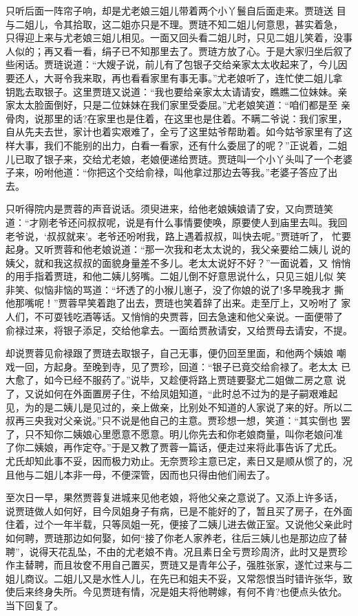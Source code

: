只听后面一阵帘子响，却是尤老娘三姐儿带着两个小丫鬟自后面走来。贾琏送
目与二姐儿，令其拾取，这二姐亦只是不理。贾琏不知二姐儿何意思，甚实着急，
只得迎上来与尤老娘三姐儿相见。一面又回头看二姐儿时，只见二姐儿笑着，没事
人似的；再又看一看，绢子已不知那里去了。贾琏方放了心。于是大家归坐后叙了
些闲话。贾琏说道：“大嫂子说，前儿有了包银子交给亲家太太收起来了，今儿因
要还人，大哥令我来取，再也看看家里有事无事。”尤老娘听了，连忙使二姐儿拿
钥匙去取银子。这里贾琏又说道：“我也要给亲家太太请请安，瞧瞧二位妹妹。亲
家太太脸面倒好，只是二位妹妹在我们家里受委屈。”尤老娘笑道：“咱们都是至
亲骨肉，说那里的话?在家里也是住着，在这里也是住着。不瞒二爷说：我们家里，
自从先夫去世，家计也着实艰难了，全亏了这里姑爷帮助着。如今姑爷家里有了这
样大事，我们不能别的出力，白看一看家，还有什么委屈了的呢？”正说着，二姐
儿已取了银子来，交给尤老娘，老娘便递给贾琏。贾琏叫一个小丫头叫了一个老婆
子来，吩咐他道：“你把这个交给俞禄，叫他拿过那边去等我。”老婆子答应了出
去。

只听得院内是贾蓉的声音说话。须臾进来，给他老娘姨娘请了安，又向贾琏笑
道：“才刚老爷还问叔叔呢，说是有什么事情要使唤，原要使人到庙里去叫。我回
老爷说，‘叔叔就来’。老爷还吩咐我，路上遇着叔叔，叫快去呢。”贾琏听了，
忙要起身。又听贾蓉和他老娘说道：“那一次我和老太太说的，我父亲要给二姨儿
说的姨父，就和我这叔叔的面貌身量差不多儿。老太太说好不好？”一面说着，又
悄悄的用手指着贾琏，和他二姨儿努嘴。二姐儿倒不好意思说什么，只见三姐儿似
笑非笑、似恼非恼的骂道：“坏透了的小猴儿崽子，没了你娘的说了!多早晚我才
撕他那嘴呢！”贾蓉早笑着跑了出去，贾琏也笑着辞了出来。走至厅上，又吩咐了
家人们，不可耍钱吃酒等话。又悄悄的央贾蓉，回去急速和他父亲说。一面便带了
俞禄过来，将银子添足，交给他拿去。一面给贾赦请安，又给贾母去请安，不提。

却说贾蓉见俞禄跟了贾琏去取银子，自己无事，便仍回至里面，和他两个姨娘
嘲戏一回，方起身。至晚到寺，见了贾珍，回道：“银子已竟交给俞禄了。老太太
已大愈了，如今已经不服药了。”说毕，又趁便将路上贾琏要娶尤二姐做二房之意
说了，又说如何在外面置房子住，不给凤姐知道，“此时总不过为的是子嗣艰难起
见，为的是二姨儿是见过的，亲上做亲，比别处不知道的人家说了来的好。所以二
叔再三央我对父亲说。”只不说是他自己的主意。贾珍想一想，笑道：“其实倒也
罢了，只不知你二姨娘心里愿意不愿意。明儿你先去和你老娘商量，叫你老娘问准
了你二姨娘，再作定夺。”于是又教了贾蓉一篇话，便走过来将此事告诉了尤氏。
尤氏却知此事不妥，因而极力劝止。无奈贾珍主意已定，素日又是顺从惯了的，况
且他与二姐儿本非一母，不便深管，因而也只得由他们闹去了。

至次日一早，果然贾蓉复进城来见他老娘，将他父亲之意说了。又添上许多话，
说贾琏做人如何好，目今凤姐身子有病，已是不能好的了，暂且买了房子，在外面
住着，过个一年半载，只等凤姐一死，便接了二姨儿进去做正室。又说他父亲此时
如何聘，贾琏那边如何娶，如何“接了你老人家养老，往后三姨儿也是那边应了替
聘”，说得天花乱坠，不由的尤老娘不肯。况且素日全亏贾珍周济，此时又是贾珍
作主替聘，而且妆奁不用自己置买，贾琏又是青年公子，强胜张家，遂忙过来与二
姐儿商议。二姐儿又是水性人儿，在先已和姐夫不妥，又常怨恨当时错许张华，致
使后来终身失所。今见贾琏有情，况是姐夫将他聘嫁，有何不肯?也便点头依允。
当下回复了。

